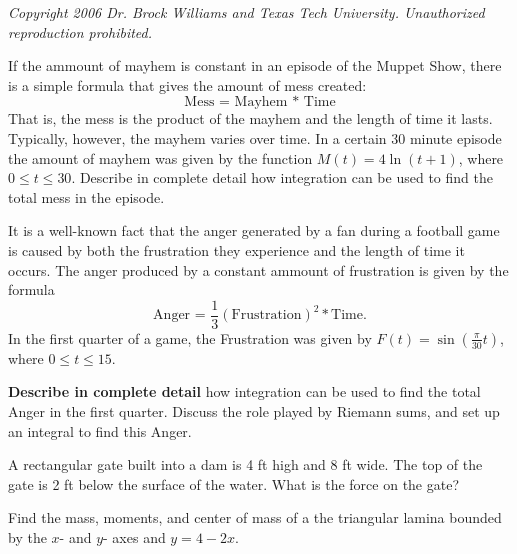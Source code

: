 \documentclass{exam}[12pt]
\begin{document}
\pagestyle{head}

\small{\textit{
Copyright 2006 Dr. Brock Williams and
Texas Tech University.  Unauthorized reproduction prohibited.
}}

\begin{questions}
\large{


\question If the ammount of mayhem is constant in an episode of the
Muppet Show, there is a simple formula that gives the amount of mess created:
\[
\text{Mess = Mayhem * Time}
\]
That is, the mess is the product of the mayhem and the length of time it lasts.
Typically, however, the mayhem varies over time.  
In a certain 30 minute episode the amount of mayhem was given by the function 
$M(t) = 4 \ln(t+1)$, where $0\leq t\leq 30$.
Describe in complete detail how integration can be used to 
find the total mess in the episode.
\vspace{.4in}


\question  It is a well-known fact that the anger generated by a fan
during a football game is caused by both the frustration they experience
and the length of time it occurs.  The anger produced by a 
 constant ammount of frustration is given by the formula
\[
\text{Anger = }\frac{1}{3} \left(\text {Frustration}\right)^2 * \text{Time}.
\]
In the first quarter of a game, the Frustration was given by
$\displaystyle F(t)= \sin\left(\frac{\pi}{30} t\right)  $, where $0\leq t\leq 15$.
\vspace{.1in}

\textbf{Describe in complete detail} how integration can be used to find
the total Anger in the first quarter.  Discuss the role played by Riemann 
sums, and set up an integral to find this Anger.

\vspace{.4in}

\question A rectangular gate built into a dam is 4 ft high and 8 ft wide.
The top of the gate is 2 ft below the surface of the water.  What is the 
force on the gate?

\vspace{.3in}
\question Find the mass, moments, and center of mass of a the
triangular lamina bounded by the $x$- and $y$- axes and $y=4-2x$.

}
\end{questions}
\end{document}
